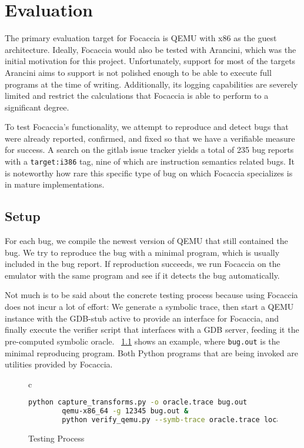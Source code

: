 \chapter{Evaluation}

The primary evaluation target for Focaccia is QEMU with x86 as the guest architecture. Ideally, Focaccia would also be
tested with Arancini, which was the initial motivation for this project. Unfortunately, support for most of the targets
Arancini aims to support is not polished enough to be able to execute full programs at the time of writing.
Additionally, its logging capabilities are severely limited and restrict the calculations that Focaccia is able to
perform to a significant degree.

To test Focaccia's functionality, we attempt to reproduce and detect bugs that were already reported, confirmed, and
fixed so that we have a verifiable measure for success. A search on the gitlab issue tracker yields a total of 235 bug
reports with a \texttt{target:i386} tag, nine of which are instruction semantics related bugs. It is noteworthy how rare
this specific type of bug on which Focaccia specializes is in mature implementations.

\section{Setup}

For each bug, we compile the newest version of QEMU that still contained the bug. We try to reproduce the bug with a
minimal program, which is usually included in the bug report. If reproduction succeeds, we run Focaccia on the emulator
with the same program and see if it detects the bug automatically.

Not much is to be said about the concrete testing process because using Focaccia does not incur a lot of effort: We
generate a symbolic trace, then start a QEMU instance with the GDB-stub active to provide an interface for Focaccia, and
finally execute the verifier script that interfaces with a GDB server, feeding it the pre-computed symbolic oracle.
\figurename~\ref{fig:testing_process} shows an example, where \texttt{bug.out} is the minimal reproducing program. Both
Python programs that are being invoked are utilities provided by Focaccia.

\begin{figure}[htbp]
    \centering
    \begin{tabular}{c}
    \begin{lstlisting}[language=bash]
        python capture_transforms.py -o oracle.trace bug.out
        qemu-x86_64 -g 12345 bug.out &
        python verify_qemu.py --symb-trace oracle.trace localhost 12345
    \end{lstlisting}
    \end{tabular}
    \caption{Testing Process}\label{fig:testing_process}
\end{figure}

